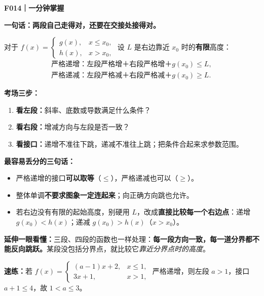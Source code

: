 \clearpage
\begin{summarybox}
\textbf{\textcolor{CSummary}{F014｜一分钟掌握}}

\textbf{一句话：两段自己走得对，还要在交接处接得对。}

对于 $f(x)=\begin{cases}g(x),&x\le x_0,\\h(x),&x>x_0,\end{cases}$ 设 $L$ 是右边靠近 $x_0$ 时的\textbf{有限}高度：
\[
 \boxed{\begin{array}{l}
 \text{严格递增：左段严格增＋右段严格增＋}g(x_0)\le L,\\[3pt]
 \text{严格递减：左段严格减＋右段严格减＋}g(x_0)\ge L.
 \end{array}}
\]

\textbf{考场三步：}
\begin{enumerate}[leftmargin=*,itemsep=0.2em]
\item \textbf{看左段：}斜率、底数或导数满足什么条件？
\item \textbf{看右段：}增减方向与左段是否一致？
\item \textbf{看接口：}递增不准往下跳，递减不准往上跳；把条件合起来求参数范围。
\end{enumerate}

\textbf{最容易丢分的三句话：}
\begin{itemize}[leftmargin=*,itemsep=0.2em]
\item 严格递增的接口\textbf{可以取等}（$\le$），严格递减也可以（$\ge$）。
\item 整体单调\textbf{不要求图象一定连起来}；向正确方向跳也允许。
\item 若右边没有有限的起始高度，别硬用 $L$，改成\textbf{直接比较每一个右边点}：递增 $g(x_0)<h(x)$；递减 $g(x_0)>h(x)$（$x>x_0$）。
\end{itemize}

\textbf{延伸一眼看懂：}三段、四段的函数也一样处理：\textbf{每一段方向一致，每一道分界都不能反向跳跃。}某段没包括分界点，就比较它\emph{靠近分界点时的高度}。

\end{summarybox}
\clearpage
\begin{summarybox}

\textbf{速练：}若 $f(x)=\begin{cases}(a-1)x+2,&x\le1,\\3x+1,&x>1,\end{cases}$ 严格递增，则左段 $a>1$，接口 $a+1\le4$，故 $\boxed{1<a\le3}$。
\end{summarybox}
